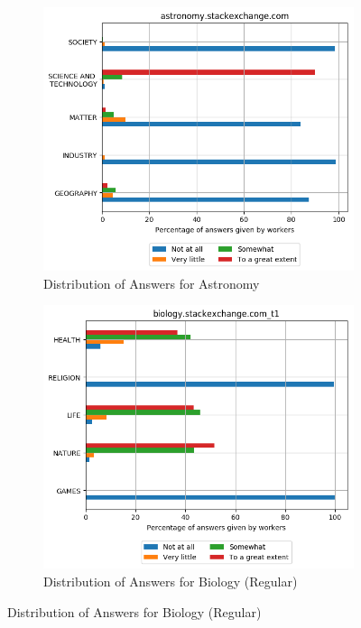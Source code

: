 

 \begin{figure}[H]
    \centering
    \begin{subfigure}{0.5\textwidth}
    \centering
        \includegraphics[width=1\linewidth]{imgs/crowd-results/astronomy_stackexchange_com}
        \caption{Distribution of Answers for Astronomy}
        \label{fig:crowd-astronomy}
    \end{subfigure}%
    \begin{subfigure}{0.5\textwidth}
    \centering
        \includegraphics[width=1\linewidth]{imgs/crowd-results/biology_stackexchange_com_t1}
        \caption{Distribution of Answers for Biology (Regular)}
        \label{fig:crowd-biology-1}
    \end{subfigure}
 

\end{figure}
